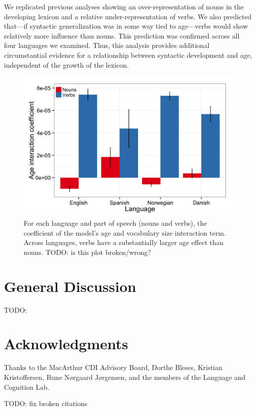 \documentclass[10pt,letterpaper]{article}
\begin{document}
We replicated previous analyses showing an over-representation of nouns in the developing lexicon and a relative under-representation of verbs. We also predicted that---if syntactic generalization was in some way tied to age---verbs would show relatively more influence than nouns. This prediction was confirmed across all four languages we examined. Thus, this analysis provides additional circumstantial evidence for a relationship between syntactic development and age, independent of the growth of the lexicon.
 

\begin{figure}[!tb]
\begin{center}
\includegraphics[width=\textwidth]{plots/coefs_noun_verb.png}
\end{center}
\caption{\label{fig:coefs_noun_verb} For each language and part of speech (nouns and verbs), the coefficient of the model's age and vocabulary size interaction term. Across languages, verbs have a substantially larger age effect than nouns. TODO: is this plot broken/wrong?}
\end{figure}

\section{General Discussion}

TODO: \lipsum[2-4]

\section{Acknowledgments}

Thanks to the MacArthur CDI Advisory Board, Dorthe Bleses, Kristian Kristoffersen, Rune N\o rgaard J\o rgensen, and the members of the Language and Cognition Lab. 



\setlength{\bibleftmargin}{.125in}
\setlength{\bibindent}{-\bibleftmargin}

TODO: fix broken citations


\end{document}
